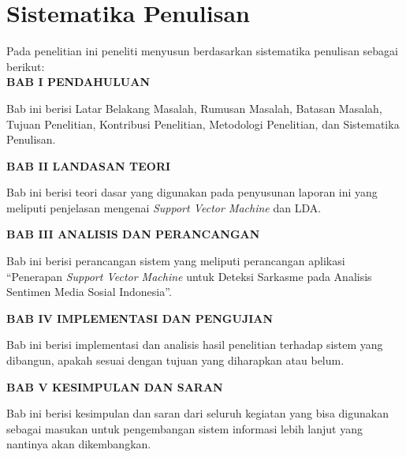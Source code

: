 \section{Sistematika Penulisan}
Pada penelitian ini peneliti menyusun berdasarkan sistematika penulisan sebagai berikut: \\[0.5cm]
\noindent \textbf{BAB I \hspace{1cm} PENDAHULUAN}
\begin{addmargin}[2.35cm]{0em}
Bab ini berisi Latar Belakang Masalah, Rumusan Masalah, Batasan Masalah, Tujuan Penelitian, Kontribusi Penelitian, Metodologi Penelitian, dan Sistematika Penulisan. 
\end{addmargin}
\noindent \textbf{BAB II \hspace{0.8cm} LANDASAN TEORI}
\begin{addmargin}[2.35cm]{0em}
Bab ini berisi teori dasar yang digunakan pada penyusunan laporan ini yang meliputi penjelasan mengenai \textit{Support Vector Machine} dan LDA.
\end{addmargin}
\noindent \textbf{BAB III \hspace{0.7cm} ANALISIS DAN PERANCANGAN}
\begin{addmargin}[2.35cm]{0em}
Bab ini berisi perancangan sistem yang meliputi perancangan aplikasi “Penerapan \textit{Support Vector Machine} untuk Deteksi Sarkasme pada Analisis Sentimen Media Sosial Indonesia”.
\end{addmargin}
\noindent \textbf{BAB IV \hspace{0.7cm} IMPLEMENTASI DAN PENGUJIAN}
\begin{addmargin}[2.35cm]{0em}
Bab ini berisi implementasi dan analisis hasil penelitian terhadap sistem yang dibangun, apakah sesuai dengan tujuan yang diharapkan atau belum.
\end{addmargin}
\noindent \textbf{BAB V \hspace{0.8cm} KESIMPULAN DAN SARAN}
\begin{addmargin}[2.35cm]{0em}
Bab ini berisi kesimpulan dan saran dari seluruh kegiatan yang bisa digunakan sebagai masukan untuk pengembangan sistem informasi lebih lanjut yang nantinya akan dikembangkan.
\end{addmargin}

\newpage